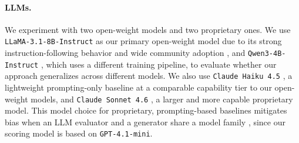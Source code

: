 \documentclass[letterpaper]{article} %
\begin{document}
\paragraph{LLMs.}
We experiment with two open-weight models and two proprietary ones. %
We use \texttt{LLaMA-3.1-8B-Instruct} as our primary open-weight model due to its strong instruction-following behavior and wide community adoption \cite{grattafiori2024llama3herdmodels}, and \texttt{Qwen3-4B-Instruct} \cite{yang2025qwen3technicalreport}, which uses a different training pipeline, to evaluate whether our approach generalizes across different models. We also use \texttt{Claude Haiku 4.5} \cite{anthropic2025haiku45}, a lightweight prompting-only baseline at a comparable capability tier to our open-weight models, and \texttt{Claude Sonnet 4.6} \cite{anthropic2025sonnet46}, a larger and more capable proprietary model. This model choice for proprietary, prompting-based baselines mitigates bias when an LLM evaluator and a generator share a model family \cite{panickssery2024llmevaluators}, since our scoring model is based on \texttt{GPT-4.1-mini}.


\end{document}
